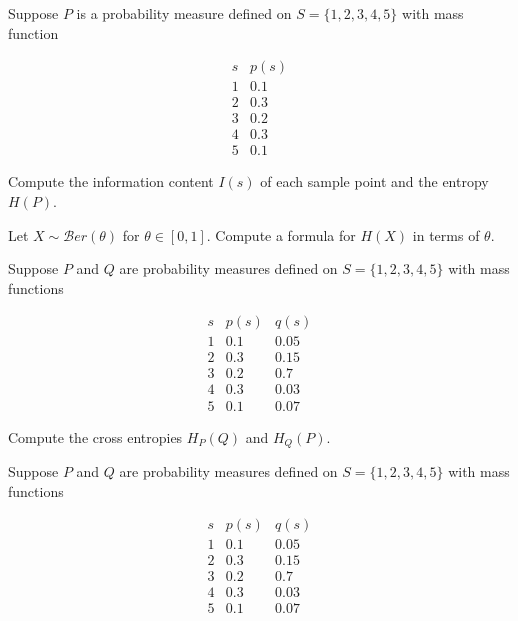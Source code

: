 \documentclass[12pt,reqno]{amsart}
\begin{document}
\bigskip

\prob Suppose $P$ is a probability measure defined on $S = \{1,2,3,4,5\}$ with mass function

	\[
	\begin{array}{c|c}
	s & p(s) \\ \hline
	1 & 0.1 \\
	2 & 0.3 \\
	3 & 0.2 \\
	4 & 0.3 \\
	5 & 0.1 
	\end{array}
	\]

Compute the information content $I(s)$ of each sample point and the entropy $H(P)$.










\vfill
\prob Let $X\sim \mathcal{B}er(\theta)$ for $\theta \in [0,1]$. Compute a formula for $H(X)$ in terms of $\theta$.










\vfill
\prob Suppose $P$ and $Q$ are probability measures defined on $S = \{1,2,3,4,5\}$ with mass functions

	\[
	\begin{array}{c|cc}
	s & p(s) & q(s) \\ \hline
	1 & 0.1 & 0.05 \\
	2 & 0.3 & 0.15 \\
	3 & 0.2 & 0.7 \\
	4 & 0.3 & 0.03 \\
	5 & 0.1 & 0.07
	\end{array}
	\]

Compute the cross entropies $H_P( Q)$ and $H_Q( P)$.











\vfill
\newpage
\prob Suppose $P$ and $Q$ are probability measures defined on $S = \{1,2,3,4,5\}$ with mass functions

	\[
	\begin{array}{c|cc}
	s & p(s) & q(s) \\ \hline
	1 & 0.1 & 0.05 \\
	2 & 0.3 & 0.15 \\
	3 & 0.2 & 0.7 \\
	4 & 0.3 & 0.03 \\
	5 & 0.1 & 0.07
	\end{array}
	\]
\end{document}
